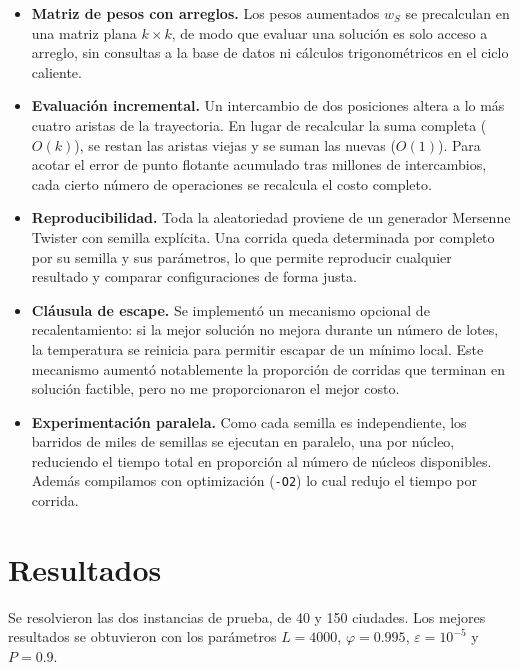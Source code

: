 \documentclass[letterpaper,12pt]{article} %
\begin{document}
\begin{itemize}
    \item \textbf{Matriz de pesos con arreglos.} Los pesos aumentados $w_S$ se
    precalculan en una matriz plana $k \times k$, de modo que evaluar una
    solución es solo acceso a arreglo, sin consultas a la base de datos ni
    cálculos trigonométricos en el ciclo caliente.

    \item \textbf{Evaluación incremental.} Un intercambio de dos posiciones
    altera a lo más cuatro aristas de la trayectoria. En lugar de recalcular la
    suma completa ($O(k)$), se restan las aristas viejas y se suman las nuevas
    ($O(1)$). Para acotar el error de punto flotante acumulado tras millones de
    intercambios, cada cierto número de operaciones se recalcula el costo
    completo.

    \item \textbf{Reproducibilidad.} Toda la aleatoriedad proviene de un
    generador Mersenne Twister con semilla explícita. Una corrida queda
    determinada por completo por su semilla y sus parámetros, lo que permite
    reproducir cualquier resultado y comparar configuraciones de forma justa.

    \item \textbf{Cláusula de escape.} Se implementó un mecanismo opcional de
    recalentamiento: si la mejor solución no mejora durante un número de lotes,
    la temperatura se reinicia para permitir escapar de un mínimo local. Este
    mecanismo aumentó notablemente la proporción de corridas que terminan en
    solución factible, pero no me proporcionaron el mejor costo.

    \item \textbf{Experimentación paralela.} Como cada semilla es independiente,
    los barridos de miles de semillas se ejecutan en paralelo, una por núcleo,
    reduciendo el tiempo total en proporción al número de núcleos disponibles. Además compilamos con optimización (\texttt{-O2}) lo cual redujo el tiempo por corrida.
\end{itemize}

\section{Resultados}

Se resolvieron las dos instancias de prueba, de 40 y 150 ciudades. Los mejores resultados se obtuvieron con los parámetros
$L = 4000$, $\varphi = 0.995$, $\varepsilon = 10^{-5}$ y $P = 0.9$.
\end{document}
